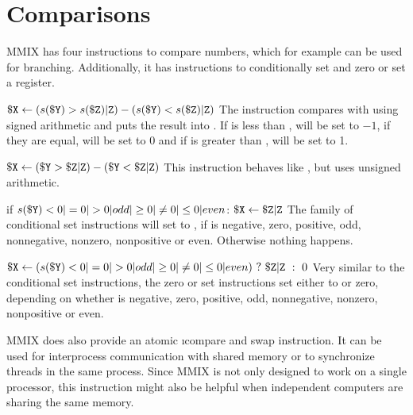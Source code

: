 \section{Comparisons}

MMIX has four instructions to compare numbers, which for example can be used for branching. Additionally, it has instructions to conditionally set and zero or set a register.

\instrtbl
	{}
	{${\tt \$X} \leftarrow (s({\tt \$Y}) > s({\tt \$Z}){\tt|Z}) - (s({\tt \$Y}) < s({\tt \$Z}){\tt|Z})$}
\noindent The instruction  compares  with  using signed arithmetic and puts the result into . If  is less than ,  will be set to $-1$, if they are equal,  will be set to 0 and if  is greater than ,  will be set to 1. \citep[pg. 11]{mmix-doc}

\instrtbl
	{}
	{${\tt \$X} \leftarrow ({\tt \$Y} > {\tt \$Z}{\tt|Z}) - ({\tt \$Y} < {\tt \$Z}{\tt|Z})$}
\noindent This instruction behaves like , but uses unsigned arithmetic. \citep[pg. 11]{mmix-doc}

\instrtbl
	{}
	{if $s(\dr{Y}) <0|=0|>0|odd|\ge0|\ne0|\le0|even$: ${\tt \$X} \leftarrow {\tt \$Z}{\tt|Z}$}
\noindent The family of conditional set instructions will set  to , if  is negative, zero, positive, odd, nonnegative, nonzero, nonpositive or even. Otherwise nothing happens. \citep[pg. 11]{mmix-doc}

\instrtbl
	{}
	{$\dr{X} \leftarrow (s(\dr{Y}) <0|=0|>0|odd|\ge0|\ne0|\le0|even)~?~\udrim{Z}~:~0$}
\noindent Very similar to the conditional set instructions, the zero or set instructions set  either to  or zero, depending on whether  is negative, zero, positive, odd, nonnegative, nonzero, nonpositive or even. \citep[pg. 11]{mmix-doc}

\medskip

MMIX does also provide an atomic \i{compare and swap} instruction. It can be used for interprocess communication with shared memory or to synchronize threads in the same process. Since MMIX is not only designed to work on a single processor, this instruction might also be helpful when independent computers are sharing the same memory. \citep[pg. 25]{mmix-doc}

